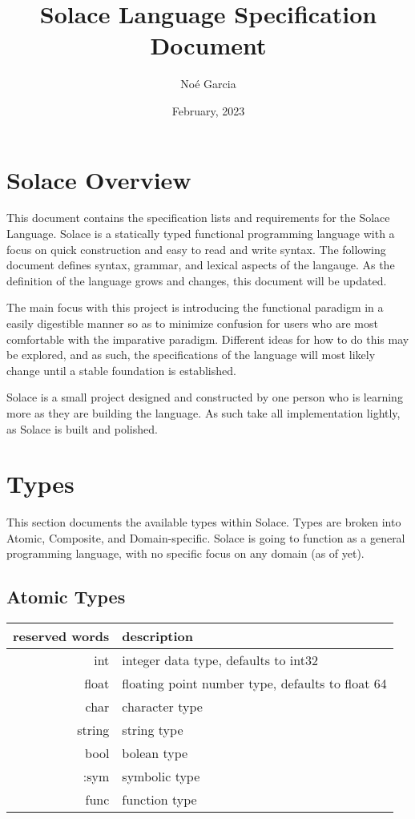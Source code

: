 \documentclass{article}
\title{
	\vspace{2in}
	\textmd{\textbf{Solace Language Specification Document}}
	\vspace{3in}
}
\author{No\'e Garcia}
\date{February, 2023}
\begin{document}
\maketitle
\newpage

\section{Solace Overview}
This document contains the specification lists and requirements for the Solace Language.
Solace is a statically typed functional programming language with a focus on quick
construction and easy to read and write syntax. The following document defines syntax,
grammar, and lexical aspects of the langauge. As the definition of the language grows
and changes, this document will be updated.

The main focus with this project is introducing the functional paradigm in a easily
digestible manner so as to minimize confusion for users who are most comfortable with
the imparative paradigm. Different ideas for how to do this may be explored, and as
such, the specifications of the language will most likely change until a
stable foundation is established.

Solace is a small project designed and constructed by one person who is learning more
as they are building the language. As such take all implementation lightly,
as Solace is built and polished.


\section{Types}
This section documents the available types within Solace. Types are broken into Atomic,
Composite, and Domain-specific. Solace is going to function as a general programming language,
with no specific focus on any domain (as of yet).

\subsection{Atomic Types}
\begin{center}
\begin{tabular}{|r|l|}
	\hline
	reserved words & description \\
	\hline
	\hline
	int & integer data type, defaults to int32 \\
	float & floating point number type, defaults to float 64 \\
	char & character type \\
	string & string type \\
	bool & bolean type \\
	:sym & symbolic type \\
	func & function type \\
	\hline
\end{tabular}
\end{center}
\end{document}
